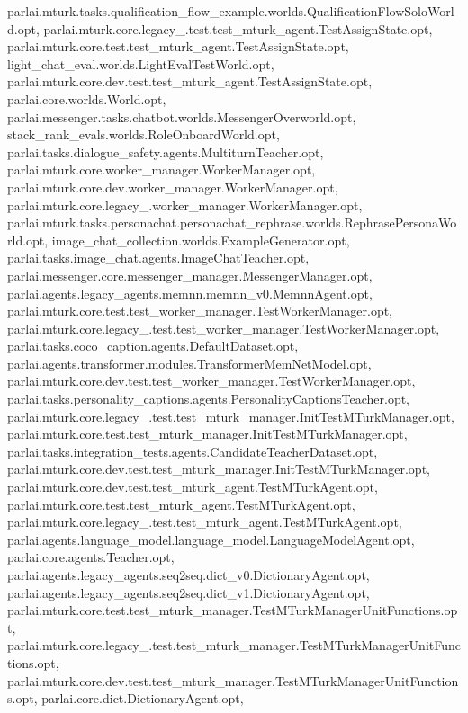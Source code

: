 parlai.\+mturk.\+tasks.\+qualification\+\_\+flow\+\_\+example.\+worlds.\+Qualification\+Flow\+Solo\+World.\+opt, parlai.\+mturk.\+core.\+legacy\+\_.\+test.\+test\+\_\+mturk\+\_\+agent.\+Test\+Assign\+State.\+opt, parlai.\+mturk.\+core.\+test.\+test\+\_\+mturk\+\_\+agent.\+Test\+Assign\+State.\+opt, light\+\_\+chat\+\_\+eval.\+worlds.\+Light\+Eval\+Test\+World.\+opt, parlai.\+mturk.\+core.\+dev.\+test.\+test\+\_\+mturk\+\_\+agent.\+Test\+Assign\+State.\+opt, parlai.\+core.\+worlds.\+World.\+opt, parlai.\+messenger.\+tasks.\+chatbot.\+worlds.\+Messenger\+Overworld.\+opt, stack\+\_\+rank\+\_\+evals.\+worlds.\+Role\+Onboard\+World.\+opt, parlai.\+tasks.\+dialogue\+\_\+safety.\+agents.\+Multiturn\+Teacher.\+opt, parlai.\+mturk.\+core.\+worker\+\_\+manager.\+Worker\+Manager.\+opt, parlai.\+mturk.\+core.\+dev.\+worker\+\_\+manager.\+Worker\+Manager.\+opt, parlai.\+mturk.\+core.\+legacy\+\_.\+worker\+\_\+manager.\+Worker\+Manager.\+opt, parlai.\+mturk.\+tasks.\+personachat.\+personachat\+\_\+rephrase.\+worlds.\+Rephrase\+Persona\+World.\+opt, image\+\_\+chat\+\_\+collection.\+worlds.\+Example\+Generator.\+opt, parlai.\+tasks.\+image\+\_\+chat.\+agents.\+Image\+Chat\+Teacher.\+opt, parlai.\+messenger.\+core.\+messenger\+\_\+manager.\+Messenger\+Manager.\+opt, parlai.\+agents.\+legacy\+\_\+agents.\+memnn.\+memnn\+\_\+v0.\+Memnn\+Agent.\+opt, parlai.\+mturk.\+core.\+test.\+test\+\_\+worker\+\_\+manager.\+Test\+Worker\+Manager.\+opt, parlai.\+mturk.\+core.\+legacy\+\_.\+test.\+test\+\_\+worker\+\_\+manager.\+Test\+Worker\+Manager.\+opt, parlai.\+tasks.\+coco\+\_\+caption.\+agents.\+Default\+Dataset.\+opt, parlai.\+agents.\+transformer.\+modules.\+Transformer\+Mem\+Net\+Model.\+opt, parlai.\+mturk.\+core.\+dev.\+test.\+test\+\_\+worker\+\_\+manager.\+Test\+Worker\+Manager.\+opt, parlai.\+tasks.\+personality\+\_\+captions.\+agents.\+Personality\+Captions\+Teacher.\+opt, parlai.\+mturk.\+core.\+legacy\+\_.\+test.\+test\+\_\+mturk\+\_\+manager.\+Init\+Test\+M\+Turk\+Manager.\+opt, parlai.\+mturk.\+core.\+test.\+test\+\_\+mturk\+\_\+manager.\+Init\+Test\+M\+Turk\+Manager.\+opt, parlai.\+tasks.\+integration\+\_\+tests.\+agents.\+Candidate\+Teacher\+Dataset.\+opt, parlai.\+mturk.\+core.\+dev.\+test.\+test\+\_\+mturk\+\_\+manager.\+Init\+Test\+M\+Turk\+Manager.\+opt, parlai.\+mturk.\+core.\+dev.\+test.\+test\+\_\+mturk\+\_\+agent.\+Test\+M\+Turk\+Agent.\+opt, parlai.\+mturk.\+core.\+test.\+test\+\_\+mturk\+\_\+agent.\+Test\+M\+Turk\+Agent.\+opt, parlai.\+mturk.\+core.\+legacy\+\_.\+test.\+test\+\_\+mturk\+\_\+agent.\+Test\+M\+Turk\+Agent.\+opt, parlai.\+agents.\+language\+\_\+model.\+language\+\_\+model.\+Language\+Model\+Agent.\+opt, parlai.\+core.\+agents.\+Teacher.\+opt, parlai.\+agents.\+legacy\+\_\+agents.\+seq2seq.\+dict\+\_\+v0.\+Dictionary\+Agent.\+opt, parlai.\+agents.\+legacy\+\_\+agents.\+seq2seq.\+dict\+\_\+v1.\+Dictionary\+Agent.\+opt, parlai.\+mturk.\+core.\+test.\+test\+\_\+mturk\+\_\+manager.\+Test\+M\+Turk\+Manager\+Unit\+Functions.\+opt, parlai.\+mturk.\+core.\+legacy\+\_.\+test.\+test\+\_\+mturk\+\_\+manager.\+Test\+M\+Turk\+Manager\+Unit\+Functions.\+opt, parlai.\+mturk.\+core.\+dev.\+test.\+test\+\_\+mturk\+\_\+manager.\+Test\+M\+Turk\+Manager\+Unit\+Functions.\+opt, parlai.\+core.\+dict.\+Dictionary\+Agent.\+opt, 